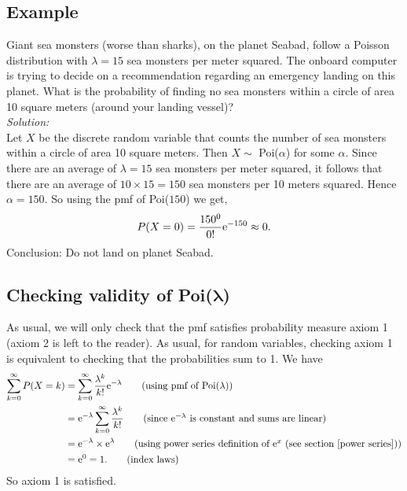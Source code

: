 \subsection{Example}
Giant sea monsters (worse than sharks), on the planet Seabad, follow a Poisson distribution with $\lambda = 15$ sea monsters per meter squared. The onboard computer is trying to decide on a recommendation regarding an emergency landing on this planet. What is the probability of finding no sea monsters within a circle of area 10 square meters (around your landing vessel)? \\

\noindent \textit{Solution:} \\
Let $X$ be the discrete random variable that counts the number of sea monsters within a circle of area 10 square meters. Then $X \sim $ Poi($\alpha$) for some $\alpha$. Since there are an average of $\lambda = 15$ sea monsters per meter squared, it follows that there are an average of $10\times15 = 150$ sea monsters per 10 meters squared. Hence $\alpha = 150.$ So using the pmf of Poi($150$) we get, 
\[
P(X = 0) = \frac{150^0}{0!}\mathrm{e}^{-150} \approx 0.
\]
Conclusion: Do not land on planet Seabad.

\subsection{Checking validity of Poi($\boldsymbol{\lambda}$)} \label{check poi(lambda)}
As usual, we will only check that the pmf satisfies probability measure axiom 1 (axiom 2 is left to the reader). As usual, for random variables, checking axiom 1 is equivalent to checking that the probabilities sum to 1. We have
\begin{align*}
\sum_{k=0}^\infty P(X = k) & = \sum_{k=0}^\infty \frac{\lambda^k}{k!}\e^{-\lambda} \tag{using pmf of Poi($\lambda$)} \\
	& = \e^{-\lambda}\sum_{k=0}^\infty \frac{\lambda^k}{k!} \tag{since $\e^{-\lambda}$ is constant and sums are linear} \\
	& = \e^{-\lambda} \times \e^{\lambda} \tag{using power series definition of $\e^x$ (see section \ref{power series})} \\
		& = \e^0 = 1. \tag{index laws}
\end{align*}
So axiom 1 is satisfied.

